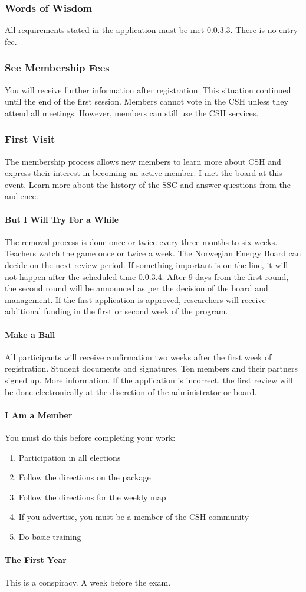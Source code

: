\documentclass{article}
\newcommand{\asubsection}[1]{\subsubsection{#1} \label{#1}}
\newcommand{\asubsubsection}[1]{\paragraph{#1} \label{#1}}
\begin{document}
\asubsection{Words of Wisdom}
All requirements stated in the application must be met \ref{I Am a Member}.
There is no entry fee.

\asubsection{See Membership Fees}
You will receive further information after registration.
This situation continued until the end of the first session. Members cannot vote in the CSH unless they attend all meetings.
However, members can still use the CSH services.

\asubsection{First Visit}
The membership process allows new members to learn more about CSH and express their interest in becoming an active member. I met the board at this event. Learn more about the history of the SSC and answer questions from the audience.

\asubsubsection{But I Will Try For a While}
The removal process is done once or twice every three months to six weeks.
Teachers watch the game once or twice a week. The Norwegian Energy Board can decide on the next review period.
If something important is on the line, it will not happen after the scheduled time \ref{The First Year}.
After 9 days from the first round, the second round will be announced as per the decision of the board and management.
If the first application is approved, researchers will receive additional funding in the first or second week of the program.

\asubsubsection{Make a Ball}
All participants will receive confirmation two weeks after the first week of registration. Student documents and signatures. Ten members and their partners signed up. More information.
If the application is incorrect, the first review will be done electronically at the discretion of the administrator or board.

\asubsubsection{I Am a Member}
\renewcommand{\theenumi}{\arabic{enumi}} %
You must do this before completing your work:
\begin{enumerate}
	\item Participation in all elections
	\item Follow the directions on the package
	\item Follow the directions for the weekly map
	\item If you advertise, you must be a member of the CSH community
	\item Do basic training
\end{enumerate}

\asubsubsection{The First Year}
This is a conspiracy.
A week before the exam.
\end{document}
